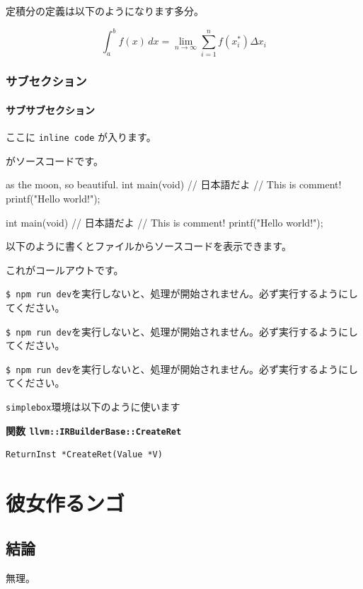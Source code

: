 \documentclass[main.tex]{subfiles}
\begin{document}
\clearpage

定積分の定義は以下のようになります多分。

\begin{equation*}
    \int_a^b f(x) \,dx = \lim_{n \to \infty} \sum_{i=1}^{n} f(x_i^*) \Delta x_i
\end{equation*}

\subsection{サブセクション}

\subsubsection{サブサブセクション}

ここに \texttt{inline code} が入ります。

がソースコードです。

\begin{sourcecode}[label=lst:src]{as the moon, so beautiful.}
int main(void)
{
    // 日本語だよ
    // This is comment!
    printf("Hello world!");
}
\end{sourcecode}

\begin{sourcecode*}
int main(void)
{
    // 日本語だよ
    // This is comment!
    printf("Hello world!");
}
\end{sourcecode*}

以下のように書くとファイルからソースコードを表示できます。

\begin{codebox}
    
\end{codebox}

\clearpage

これがコールアウトです。
\begin{note}
    \texttt{\$ npm run dev}を実行しないと、処理が開始されません。必ず実行するようにしてください。
\end{note}

\begin{warn}
    \texttt{\$ npm run dev}を実行しないと、処理が開始されません。必ず実行するようにしてください。
\end{warn}

\begin{caution}
    \texttt{\$ npm run dev}を実行しないと、処理が開始されません。必ず実行するようにしてください。
\end{caution}

\texttt{simplebox}環境は以下のように使います

\begin{simplebox}
\textbf{関数 \texttt{llvm::IRBuilderBase::CreateRet}}
\tcblower
{\small%
\begin{verbatim}
ReturnInst *CreateRet(Value *V)
\end{verbatim}%
}
\end{simplebox}

\appendix

\chapter{彼女作るンゴ}

\section{結論}

無理。

\newpage
\end{document}
